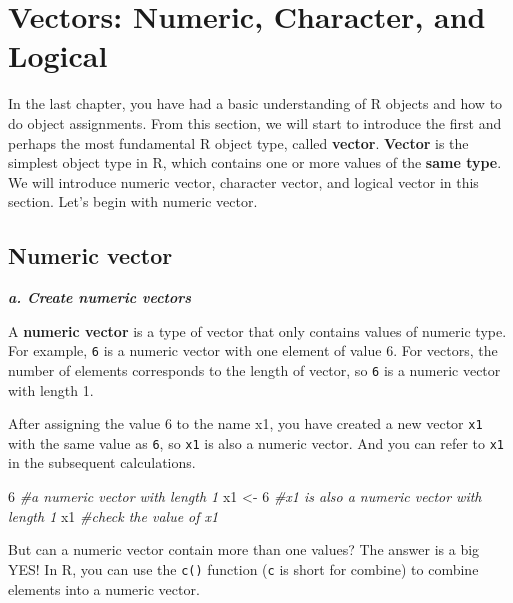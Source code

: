 \documentclass[
]{book}
\newenvironment{Shaded}{\begin{snugshade}}{\end{snugshade}}
\newcommand{\CommentTok}[1]{\textcolor[rgb]{0.56,0.35,0.01}{\textit{#1}}}
\newcommand{\DecValTok}[1]{\textcolor[rgb]{0.00,0.00,0.81}{#1}}
\newcommand{\NormalTok}[1]{#1}
\newcommand{\OtherTok}[1]{\textcolor[rgb]{0.56,0.35,0.01}{#1}}
\begin{document}
\hypertarget{vector}{%
\section{Vectors: Numeric, Character, and Logical}\label{vector}}

In the last chapter, you have had a basic understanding of R objects and how to do object assignments. From this section, we will start to introduce the first and perhaps the most fundamental R object type, called \textbf{vector}. \textbf{Vector} is the simplest object type in R, which contains one or more values of the \textbf{same type}. We will introduce numeric vector, character vector, and logical vector in this section. Let's begin with numeric vector.

\hypertarget{numeric-vector}{%
\subsection{Numeric vector}\label{numeric-vector}}

\textbf{\emph{a. Create numeric vectors}}

A \textbf{numeric vector} is a type of vector that only contains values of numeric type. For example, \texttt{6} is a numeric vector with one element of value 6. For vectors, the number of elements corresponds to the length of vector, so \texttt{6} is a numeric vector with length 1.

After assigning the value 6 to the name x1, you have created a new vector \texttt{x1} with the same value as \texttt{6}, so \texttt{x1} is also a numeric vector. And you can refer to \texttt{x1} in the subsequent calculations.

\begin{Shaded}
\begin{Highlighting}[]
\DecValTok{6}                         \CommentTok{\#a numeric vector with length 1}
\NormalTok{x1 }\OtherTok{\textless{}{-}} \DecValTok{6}                   \CommentTok{\#x1 is also a numeric vector with length 1}
\NormalTok{x1                        }\CommentTok{\#check the value of x1}
\end{Highlighting}
\end{Shaded}

But can a numeric vector contain more than one values? The answer is a big YES! In R, you can use the \texttt{c()} function (\texttt{c} is short for combine) to combine elements into a numeric vector.
\end{document}
